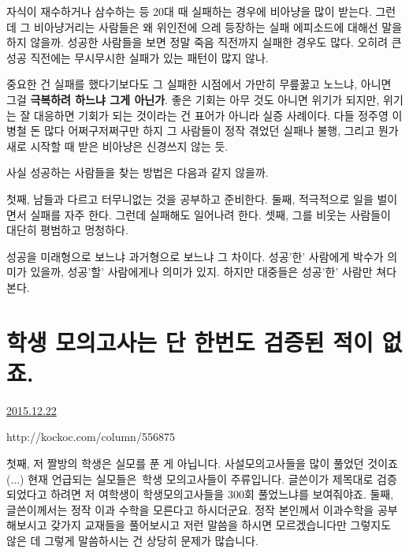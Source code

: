 자식이 재수하거나 삼수하는 등 20대 때 실패하는 경우에 비아냥을 많이 받는다.
그런데 그 비아냥거리는 사람들은 왜 위인전에 으레 등장하는 실패 에피소드에 대해선 말을 하지 않을까.
성공한 사람들을 보면 정말 죽음 직전까지 실패한 경우도 많다.
오히려 큰 성공 직전에는 무시무시한 실패가 있는 패턴이 많지 않나.
\vspace{5mm}

중요한 건 실패를 했다기보다도 그 실패한 시점에서 가만히 무릎꿇고 노느냐, 아니면 그걸 \textbf{극복하려 하느냐 그게 아닌가}.
좋은 기회는 아무 것도 아니면 위기가 되지만, 위기는 잘 대응하면 기회가 되는 것이라는 건 표어가 아니라 실증 사례이다.
다들 정주영 이병철 돈 많다 어쩌구저쩌구만 하지 그 사람들이 정작 겪었던 실패나 불행, 그리고 뭔가 새로 시작할 때 받은 비아냥은 신경쓰지 않는 듯.
\vspace{5mm}

사실 성공하는 사람들을 찾는 방법은 다음과 같지 않을까.
\vspace{5mm}

첫째, 남들과 다르고 터무니없는 것을 공부하고 준비한다.
둘째, 적극적으로 일을 벌이면서 실패를 자주 한다. 그런데 실패해도 일어나려 한다.
셋째, 그를 비웃는 사람들이 대단히 평범하고 멍청하다.
\vspace{5mm}

성공을 미래형으로 보느냐 과거형으로 보느냐 그 차이다.
성공'한' 사람에게 박수가 의미가 있을까, 성공'할' 사람에게나 의미가 있지.
하지만 대중들은 성공'한' 사람만 쳐다본다.
\vspace{5mm}






\section{학생 모의고사는 단 한번도 검증된 적이 없죠.}
\href{https://www.kockoc.com/Apoc/558076}{2015.12.22}

\vspace{5mm}

http://kockoc.com/column/556875
\vspace{5mm}

첫째, 저 짤방의 학생은 실모를 푼 게 아닙니다. 사설모의고사들을 많이 풀었던 것이죠(...)
현재 언급되는 실모들은 학생 모의고사들이 주류입니다.
글쓴이가 제목대로 검증되었다고 하려면 저 여학생이 학생모의고사들을 300회 풀었느냐를 보여줘야죠.
둘째, 글쓴이께서는 정작 이과 수학을 모른다고 하시더군요.
정작 본인께서 이과수학을 공부해보시고 갖가지 교재들을 풀어보시고 저런 말씀을 하시면 모르겠습니다만
그렇지도 않은 데 그렇게 말씀하시는 건 상당히 문제가 많습니다.
\vspace{5mm}

